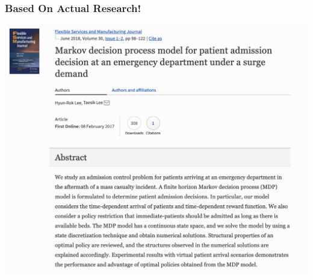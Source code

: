 \documentclass{beamer}
\begin{document}
\begin{frame}
\titlepage %
\end{frame}


%

\begin{frame}
  \frametitle{Based On Actual Research!}
  \centering
  \includegraphics[scale = .3]{paper}
\end{frame}
\end{document}
